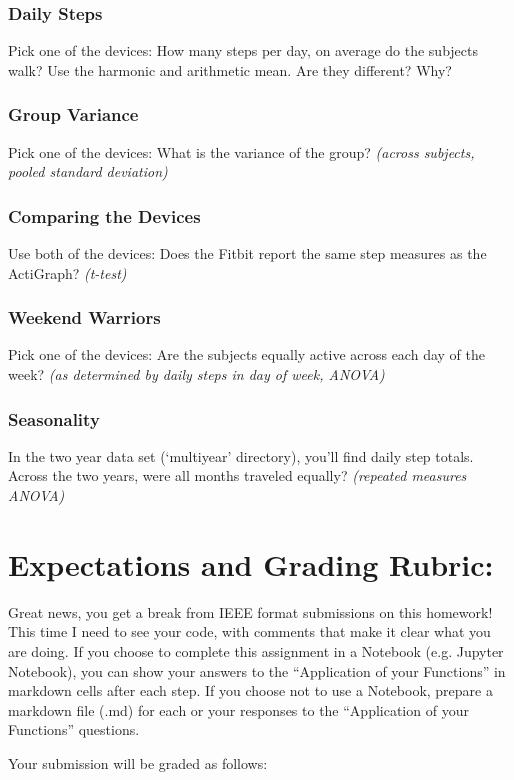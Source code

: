 \documentclass[11pt]{article}
\begin{document}
\subsubsection*{Daily Steps}
Pick one of the devices: How many steps per day, on average do the subjects walk? Use the harmonic and arithmetic mean.  Are they different?  Why?

\subsubsection*{Group Variance}
Pick one of the devices: What is the variance of the group? {\em (across subjects, pooled standard deviation)}

\subsubsection*{Comparing the Devices}
Use both of the devices: Does the Fitbit report the same step measures as the ActiGraph? {\em (t-test)}

\subsubsection*{Weekend Warriors}
Pick one of the devices: Are the subjects equally active across each day of the week? {\em (as determined by daily steps in day of week, ANOVA)}

\subsubsection*{Seasonality}
In the two year data set (`multiyear' directory), you’ll find daily step totals. Across the two years, were all months traveled equally? {\em (repeated measures ANOVA)}

\section*{Expectations and Grading Rubric:}
Great news, you get a break from IEEE format submissions on this homework!  This time I need to see your code, with comments that make it clear what you are doing.  If you choose to complete this assignment in a Notebook (e.g. Jupyter Notebook), you can show your answers to the ``Application of your Functions'' in markdown cells after each step.  If you choose not to use a Notebook, prepare a markdown file (.md) for each or your responses to the ``Application of your Functions'' questions.

Your submission will be graded as follows:
\end{document}
